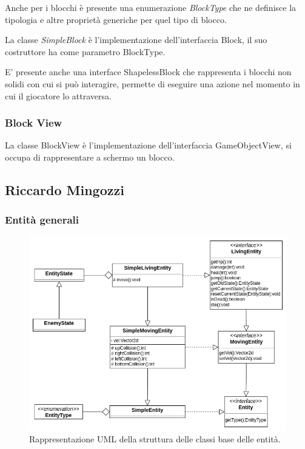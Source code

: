 \documentclass[a4paper,12pt]{report}
\begin{document}
    Anche per i blocchi è presente una enumerazione \emph{BlockType} che ne definisce la tipologia e altre proprietà generiche per quel tipo di blocco.

    La classe \emph{SimpleBlock} è l'implementazione dell'interfaccia Block, il suo costruttore ha come parametro BlockType.

    E' presente anche una interface ShapelessBlock che rappresenta i blocchi non solidi con cui si può interagire, permette di eseguire una azione nel momento in cui il giocatore lo attraversa.

    \subsubsection{Block View}

    La classe BlockView è l'implementazione dell'interfaccia GameObjectView, si occupa di rappresentare a schermo un blocco.

    \subsection*{Riccardo Mingozzi}

    \subsubsection{Entità generali}

    \begin{figure}[H]
        \centering{}
        \includegraphics[scale=0.5] {img/entities-general.png}
        \caption{Rappresentazione UML della struttura delle classi base delle entità.}
        \label{img:entities-general}
    \end{figure}
\end{document}
